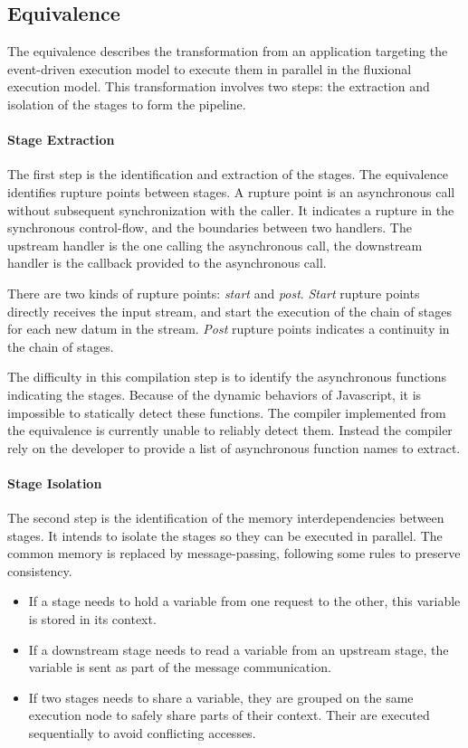 \subsection{Equivalence}

The equivalence describes the transformation from an application targeting the event-driven execution model to execute them in parallel in the fluxional execution model.
This transformation involves two steps: the extraction and isolation of the stages to form the pipeline.

\paragraph{Stage Extraction} \label{chapter7:summary:extraction}

The first step is the identification and extraction of the stages.
The equivalence identifies rupture points between stages.
A rupture point is an asynchronous call without subsequent synchronization with the caller.
It indicates a rupture in the synchronous control-flow, and the boundaries between two handlers.
The upstream handler is the one calling the asynchronous call, the downstream handler is the callback provided to the asynchronous call.

There are two kinds of rupture points: \textit{start} and \textit{post}.
\textit{Start} rupture points directly receives the input stream, and start the execution of the chain of stages for each new datum in the stream.
\textit{Post} rupture points indicates a continuity in the chain of stages.

The difficulty in this compilation step is to identify the asynchronous functions indicating the stages.
Because of the dynamic behaviors of Javascript, it is impossible to statically detect these functions.
The compiler implemented from the equivalence is currently unable to reliably detect them.
Instead the compiler rely on the developer to provide a list of asynchronous function names to extract.

\paragraph{Stage Isolation} \label{chapter7:summary:isolation}

The second step is the identification of the memory interdependencies between stages.
It intends to isolate the stages so they can be executed in parallel.
The common memory is replaced by message-passing, following some rules to preserve consistency.
\begin{itemize}
\item If a stage needs to hold a variable from one request to the other, this variable is stored in its context.
\item If a downstream stage needs to read a variable from an upstream stage, the variable is sent as part of the message communication.
\item If two stages needs to share a variable, they are grouped on the same execution node to safely share parts of their context.
Their are executed sequentially to avoid conflicting accesses.
\end{itemize}

